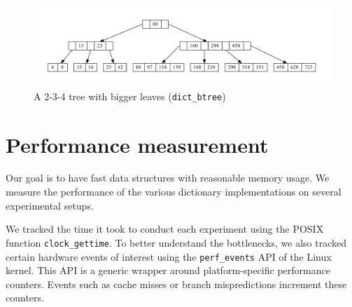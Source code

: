 \begin{figure}
\centering
\includegraphics[width=\linewidth]{img/btree}
\caption{A 2-3-4 tree with bigger leaves (\texttt{dict\_btree})}
\end{figure}

\section{Performance measurement}

Our goal is to have fast data structures with reasonable memory usage.
We measure the performance of the various dictionary implementations
on several experimental setups.

We tracked the time it took to conduct each experiment using the POSIX function
\texttt{clock\_gettime}. To better understand the bottlenecks, we also
tracked certain hardware events of interest using the \texttt{perf\_events} API
of the Linux kernel. This API is a generic wrapper around platform-specific
performance counters. Events such as cache misses or branch mispredictions
increment these counters.


